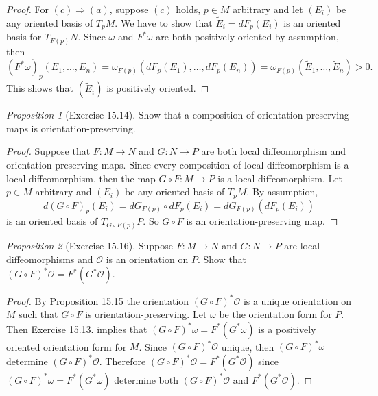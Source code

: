 \documentclass[a4paper]{article}
\theoremstyle{remark}
\newtheorem{prop}{Proposition}
\newcommand\wtilde[1]{\widetilde{#1}} %
\begin{document}
\begin{proof}
For $(c) \Rightarrow (a)$, suppose $(c)$ holds, $p\in M$ arbitrary and let $(E_i)$ be any oriented basis of $T_pM$. We have to show that $\wtilde{E}_i = dF_p(E_i)$ is an oriented basis for $T_{F(p)}N$. Since $\omega$ and $F^*\omega$ are both positively oriented by assumption, then
$$
(F^*\omega)_p(E_1,\dots,E_n) = \omega_{F(p)} (dF_p(E_1),\dots, dF_p(E_n)) = \omega_{F(p)} (\wtilde{E}_1,\dots,\wtilde{E}_n) > 0. 
$$
This shows that $(\wtilde{E}_i)$ is positively oriented.
\end{proof}

\begin{prop}[Exercise 15.14]
Show that a composition of orientation-preserving maps is orientation-preserving.
\end{prop}
\begin{proof}
Suppose that $F : M \to N$ and $G : N \to P$ are both local diffeomorphism and orientation preserving maps. Since every composition of local diffeomorphism is a local diffeomorphism, then the map $G \circ F : M \to P$ is a local diffeomorphism. Let $p \in M$ arbitrary and $(E_i)$ be any oriented basis of $T_pM$. By assumption,
$$
d(G \circ F)_p(E_i) = dG_{F(p)} \circ dF_p(E_i) = dG_{F(p)} (dF_p(E_i))
$$
is an oriented basis of $T_{G \circ F(p)}P$. So $G \circ F$ is an orientation-preserving map.
\end{proof}

\begin{prop}[Exercise 15.16]
Suppose $F : M \to N$ and $G : N \to P$ are local diffeomorphisms and $\mathcal{O}$ is an orientation on $P$. Show that $(G \circ F)^*\mathcal{O} = F^*(G^*\mathcal{O})$. 
\end{prop}
\begin{proof}
By Proposition 15.15 the orientation $(G \circ F)^*\mathcal{O}$ is a unique orientation on $M$ such that $G \circ F$ is orientation-preserving. Let $\omega$ be the orientation form for $P$. Then Exercise 15.13. implies that $(G \circ F)^*\omega=F^*(G^* \omega)$ is a positively oriented orientation form for $M$. Since $(G \circ F)^*\mathcal{O}$ unique, then $(G \circ F)^*\omega$ determine $(G \circ F)^*\mathcal{O}$. Therefore $(G \circ F)^*\mathcal{O} = F^*(G^*\mathcal{O})$ since $(G \circ F)^*\omega=F^*(G^* \omega)$ determine both $(G \circ F)^*\mathcal{O}$ and  $F^*(G^*\mathcal{O})$.
\end{proof}
\end{document}
